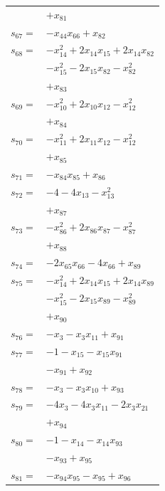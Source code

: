 \begin{longtable}{@{}r@{\;}l@{}}
 & \(\displaystyle +x_{81}\) \\[3pt]
\(s_{67}=\) & \(\displaystyle -x_{44}x_{66} +x_{82}\) \\[3pt]
\(s_{68}=\) & \(\displaystyle -x_{14}^{2} +2x_{14}x_{15} +2x_{14}x_{82}\) \\
 & \(\displaystyle -x_{15}^{2} -2x_{15}x_{82} -x_{82}^{2}\) \\
 & \(\displaystyle +x_{83}\) \\[3pt]
\(s_{69}=\) & \(\displaystyle -x_{10}^{2} +2x_{10}x_{12} -x_{12}^{2}\) \\
 & \(\displaystyle +x_{84}\) \\[3pt]
\(s_{70}=\) & \(\displaystyle -x_{11}^{2} +2x_{11}x_{12} -x_{12}^{2}\) \\
 & \(\displaystyle +x_{85}\) \\[3pt]
\(s_{71}=\) & \(\displaystyle -x_{84}x_{85} +x_{86}\) \\[3pt]
\(s_{72}=\) & \(\displaystyle -4 -4x_{13} -x_{13}^{2}\) \\
 & \(\displaystyle +x_{87}\) \\[3pt]
\(s_{73}=\) & \(\displaystyle -x_{86}^{2} +2x_{86}x_{87} -x_{87}^{2}\) \\
 & \(\displaystyle +x_{88}\) \\[3pt]
\(s_{74}=\) & \(\displaystyle -2x_{65}x_{66} -4x_{66} +x_{89}\) \\[3pt]
\(s_{75}=\) & \(\displaystyle -x_{14}^{2} +2x_{14}x_{15} +2x_{14}x_{89}\) \\
 & \(\displaystyle -x_{15}^{2} -2x_{15}x_{89} -x_{89}^{2}\) \\
 & \(\displaystyle +x_{90}\) \\[3pt]
\(s_{76}=\) & \(\displaystyle -x_{3} -x_{3}x_{11} +x_{91}\) \\[3pt]
\(s_{77}=\) & \(\displaystyle -1 -x_{15} -x_{15}x_{91}\) \\
 & \(\displaystyle -x_{91} +x_{92}\) \\[3pt]
\(s_{78}=\) & \(\displaystyle -x_{3} -x_{3}x_{10} +x_{93}\) \\[3pt]
\(s_{79}=\) & \(\displaystyle -4x_{3} -4x_{3}x_{11} -2x_{3}x_{21}\) \\
 & \(\displaystyle +x_{94}\) \\[3pt]
\(s_{80}=\) & \(\displaystyle -1 -x_{14} -x_{14}x_{93}\) \\
 & \(\displaystyle -x_{93} +x_{95}\) \\[3pt]
\(s_{81}=\) & \(\displaystyle -x_{94}x_{95} -x_{95} +x_{96}\) \\[3pt]

\end{longtable}
